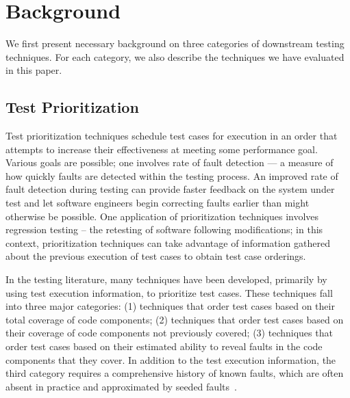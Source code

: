 \section{Background}

We first present necessary background on three
categories of downstream testing techniques.
For each category, we also describe the techniques
we have evaluated in this paper.


\subsection{Test Prioritization}

Test prioritization techniques schedule test cases
for execution in an order that attempts to
increase their effectiveness at meeting some performance goal.
Various goals are possible; one involves
rate of fault detection --- a measure of how quickly
faults are detected within the testing process. An
improved rate of fault detection during testing can
provide faster feedback on the system under test and
let software engineers begin correcting faults earlier
than might otherwise be possible. One application
of prioritization techniques involves regression testing --
the retesting of software following modifications;
in this context, prioritization techniques can take advantage of information gathered about the previous
execution of test cases to obtain test case orderings.

In the testing literature, many
techniques have been developed, primarily by using test execution
information, to prioritize test cases. These techniques
fall into three major categories: (1) techniques
that order test cases based on their total coverage of
code components; (2) techniques that order test
cases based on their coverage of code components
not previously covered; (3) techniques that order test
cases based on their estimated ability to reveal faults
in the code components that they cover. In addition to the
test execution information, the third
category requires a comprehensive history of known
faults, which are often absent in practice and
approximated by seeded faults~\cite{}.


